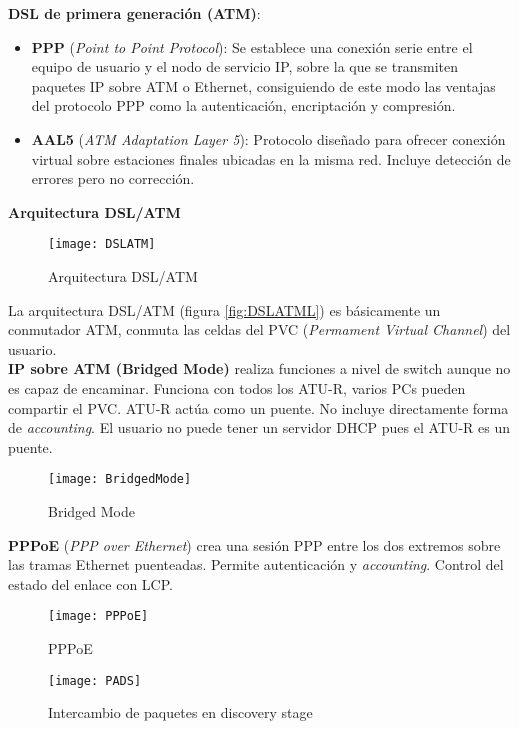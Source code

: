 \documentclass[10pt,portrait, twocolumn]{article}
\begin{document}
\textbf{DSL de primera generación (ATM)}:

	\begin{itemize}
		\item \textbf{PPP} (\textit{Point to Point Protocol}): Se establece una conexión serie entre el equipo de usuario y el nodo de servicio IP, sobre la que se transmiten paquetes IP sobre ATM o Ethernet, consiguiendo de este modo las ventajas del protocolo PPP como la autenticación, encriptación y compresión.
		\item \textbf{AAL5} (\textit{ATM Adaptation Layer 5}): Protocolo diseñado para ofrecer conexión virtual sobre estaciones finales ubicadas en la misma red. Incluye detección de errores pero no corrección.
	\end{itemize}
	
\textbf{Arquitectura DSL/ATM}

\begin{figure}[h]	
	\centering
    	\texttt{[image: DSLATM]}
	\caption{Arquitectura DSL/ATM}
	\label{fig:DSLAMATM}
  \end{figure}
  
La arquitectura DSL/ATM (figura \ref{fig:DSLATML}) es básicamente un conmutador ATM, conmuta las celdas del PVC (\textit{Permament Virtual Channel}) del usuario. \\

\textbf{IP sobre ATM (Bridged Mode)} realiza funciones a nivel de switch aunque no es capaz de encaminar.  Funciona con todos los ATU-R, varios PCs pueden compartir el PVC.  ATU-R actúa como un puente. No incluye directamente forma de \textit{accounting}. El usuario no puede tener un servidor DHCP pues el ATU-R es un puente.

\begin{figure}[h]	
	\centering
    	\texttt{[image: BridgedMode]}
	\caption{Bridged Mode}
	\label{fig:ONT}
  \end{figure}
  
\textbf{PPPoE} (\textit{PPP over Ethernet}) crea una sesión PPP entre los dos extremos sobre las tramas Ethernet puenteadas. Permite autenticación y \textit{accounting}. Control del estado del enlace con LCP.
  
\begin{figure}[h]	
	\centering
    	\texttt{[image: PPPoE]}
	\caption{PPPoE}
	\label{fig:ONT}
  \end{figure}
  
  
\begin{figure}[h]	
	\centering
    	\texttt{[image: PADS]}
	\caption{Intercambio de paquetes en discovery stage}
	\label{fig:PADS}
  \end{figure}  
  
\end{document}
